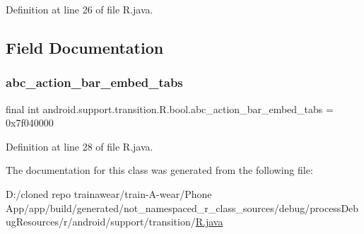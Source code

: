 Definition at line 26 of file R.\+java.


\begin{DoxyCode}{0}

\end{DoxyCode}


\subsection{Field Documentation}
\mbox{\label{classandroid_1_1support_1_1transition_1_1_r_1_1bool_a84b992ac7b4ad5bd9328f8b255a3b363}} 
\subsubsection{\texorpdfstring{abc\_action\_bar\_embed\_tabs}{abc\_action\_bar\_embed\_tabs}}
{\footnotesize\ttfamily final int android.\+support.\+transition.\+R.\+bool.\+abc\+\_\+action\+\_\+bar\+\_\+embed\+\_\+tabs = 0x7f040000\hspace{0.3cm}{\ttfamily [static]}}



Definition at line 28 of file R.\+java.



The documentation for this class was generated from the following file\+:\begin{DoxyCompactItemize}
\item 
D\+:/cloned repo trainawear/train-\/\+A-\/wear/\+Phone App/app/build/generated/not\+\_\+namespaced\+\_\+r\+\_\+class\+\_\+sources/debug/process\+Debug\+Resources/r/android/support/transition/\mbox{\hyperlink{process_debug_resources_2r_2android_2support_2transition_2_r_8java}{R.\+java}}\end{DoxyCompactItemize}
